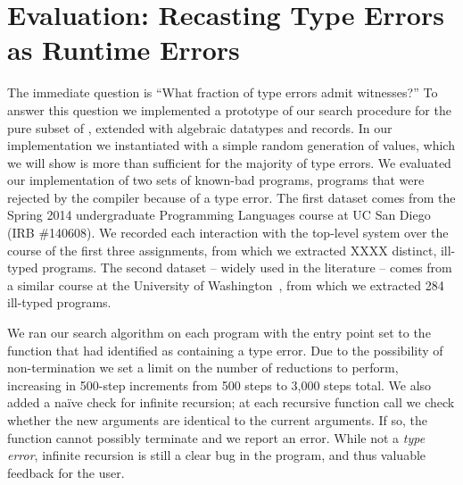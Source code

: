 \section{Evaluation: Recasting Type Errors as Runtime Errors}
\label{sec:eval-witness}
%
The immediate question is ``What fraction of type errors admit
witnesses?''
%
To answer this question we implemented a prototype of our search
procedure for the pure subset of \ocaml, \ie \lang extended with
algebraic datatypes and records. 
%
In our implementation we instantiated \gensym with a simple random
generation of values, which we will show is more than sufficient for the
majority of type errors.
%
We evaluated our implementation of two sets of known-bad programs, \ie
programs that were rejected by the \ocaml compiler because of a type
error.
%
The first dataset comes from the Spring 2014 undergraduate Programming
Languages course at UC San Diego (IRB \#140608). 
%
We recorded each interaction with the \ocaml top-level system over the
course of the first three assignments, from which we extracted XXXX
distinct, ill-typed \ocaml programs.
%
The second dataset -- widely used in the literature -- comes from a
similar course at the University of
Washington~\cite{lerner_seminal:_2006}, from which we extracted 284
ill-typed programs.

We ran our search algorithm on each program with the entry point set to
the function that \ocaml had identified as containing a type error. 
%
Due to the possibility of non-termination we set a limit on the number
of reductions to perform, increasing in 500-step increments from 500
steps to 3,000 steps total.
%
We also added a na\"ive check for infinite recursion; at each recursive
function call we check whether the new arguments are identical to the
current arguments.
%
If so, the function cannot possibly terminate and we report an error.
%
While not a \emph{type error}, infinite recursion is still a clear bug
in the program, and thus valuable feedback for the user.

